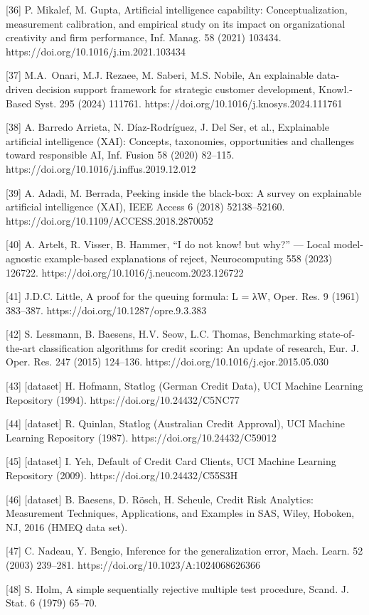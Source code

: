 \documentclass[
  11pt,
]{article}
\begin{document}
{[}36{]} P. Mikalef, M. Gupta, Artificial intelligence capability:
Conceptualization, measurement calibration, and empirical study on its
impact on organizational creativity and firm performance, Inf. Manag. 58
(2021) 103434. https://doi.org/10.1016/j.im.2021.103434

{[}37{]} M.A.~Onari, M.J. Rezaee, M. Saberi, M.S. Nobile, An explainable
data-driven decision support framework for strategic customer
development, Knowl.-Based Syst. 295 (2024) 111761.
https://doi.org/10.1016/j.knosys.2024.111761

{[}38{]} A. Barredo Arrieta, N. Díaz-Rodríguez, J. Del Ser, et al.,
Explainable artificial intelligence (XAI): Concepts, taxonomies,
opportunities and challenges toward responsible AI, Inf. Fusion 58
(2020) 82--115. https://doi.org/10.1016/j.inffus.2019.12.012

{[}39{]} A. Adadi, M. Berrada, Peeking inside the black-box: A survey on
explainable artificial intelligence (XAI), IEEE Access 6 (2018)
52138--52160. https://doi.org/10.1109/ACCESS.2018.2870052

{[}40{]} A. Artelt, R. Visser, B. Hammer, ``I do not know! but why?''
--- Local model-agnostic example-based explanations of reject,
Neurocomputing 558 (2023) 126722.
https://doi.org/10.1016/j.neucom.2023.126722

{[}41{]} J.D.C. Little, A proof for the queuing formula: L = λW, Oper.
Res. 9 (1961) 383--387. https://doi.org/10.1287/opre.9.3.383

{[}42{]} S. Lessmann, B. Baesens, H.V. Seow, L.C. Thomas, Benchmarking
state-of-the-art classification algorithms for credit scoring: An update
of research, Eur. J. Oper. Res. 247 (2015) 124--136.
https://doi.org/10.1016/j.ejor.2015.05.030

{[}43{]} {[}dataset{]} H. Hofmann, Statlog (German Credit Data), UCI
Machine Learning Repository (1994). https://doi.org/10.24432/C5NC77

{[}44{]} {[}dataset{]} R. Quinlan, Statlog (Australian Credit Approval),
UCI Machine Learning Repository (1987). https://doi.org/10.24432/C59012

{[}45{]} {[}dataset{]} I. Yeh, Default of Credit Card Clients, UCI
Machine Learning Repository (2009). https://doi.org/10.24432/C55S3H

{[}46{]} {[}dataset{]} B. Baesens, D. Rösch, H. Scheule, Credit Risk
Analytics: Measurement Techniques, Applications, and Examples in SAS,
Wiley, Hoboken, NJ, 2016 (HMEQ data set).

{[}47{]} C. Nadeau, Y. Bengio, Inference for the generalization error,
Mach. Learn. 52 (2003) 239--281. https://doi.org/10.1023/A:1024068626366

{[}48{]} S. Holm, A simple sequentially rejective multiple test
procedure, Scand. J. Stat. 6 (1979) 65--70.
\end{document}
